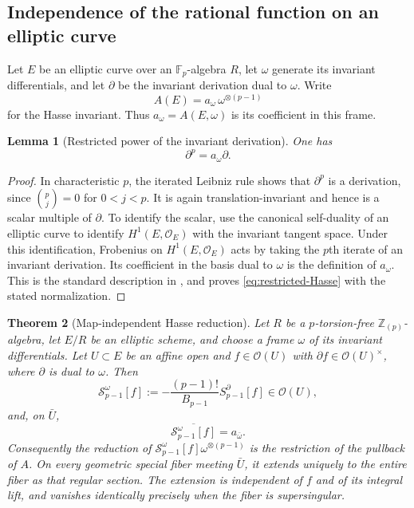 \documentclass[11pt]{amsart}
\newtheorem{thm}{Theorem}[section]
\newtheorem{lem}[thm]{Lemma}
\theoremstyle{definition}
\theoremstyle{remark}
\numberwithin{equation}{section}
\begin{document}
\subsection{Independence of the rational function on an elliptic curve}

Let $E$ be an elliptic curve over an $\mathbb F_p$-algebra $R$, let
$\omega$ generate its invariant differentials, and let $\partial$ be
the invariant derivation dual to $\omega$. Write
\[
A(E)=a_\omega\,\omega^{\otimes(p-1)}
\]
for the Hasse invariant. Thus $a_\omega=A(E,\omega)$ is its coefficient
in this frame.

\begin{lem}[Restricted power of the invariant derivation]
\label{lem:restricted-Hasse}
One has
\begin{equation}\label{eq:restricted-Hasse}
\partial^p=a_\omega\partial.
\end{equation}
\end{lem}

\begin{proof}
In characteristic $p$, the iterated Leibniz rule shows that $\partial^p$
is a derivation, since $\binom pj=0$ for $0<j<p$. It is again
translation-invariant and hence is a scalar multiple of $\partial$.
To identify the scalar, use the canonical self-duality of an elliptic
curve to identify $H^1(E,\mathcal O_E)$ with the invariant tangent
space. Under this identification, Frobenius on $H^1(E,\mathcal O_E)$
acts by taking the $p$th iterate of an invariant derivation. Its
coefficient in the basis dual to $\omega$ is the definition of
$a_\omega$. This is the standard description in
\cite[\S2.0, pp.~97--98]{katz}, and proves
\eqref{eq:restricted-Hasse} with the stated normalization.
\end{proof}

\begin{thm}[Map-independent Hasse reduction]\label{thm:general-Hasse}
Let $R$ be a $p$-torsion-free $\mathbb Z_{(p)}$-algebra, let $E/R$ be
an elliptic scheme, and choose a frame $\omega$ of its invariant
differentials. Let $U\subset E$ be an affine open and $f\in\mathcal O(U)$
with $\partial f\in\mathcal O(U)^\times$, where $\partial$ is dual to
$\omega$. Then
\[
\mathcal S_{p-1}^\omega[f]
:=-\frac{(p-1)!}{B_{p-1}}S_{p-1}^\partial[f]
\in\mathcal O(U),
\]
and, on $\bar U$,
\begin{equation}\label{eq:general-Hasse-reduction}
\overline{\mathcal S_{p-1}^\omega[f]}=a_{\bar\omega}.
\end{equation}
Consequently the reduction of
$\mathcal S_{p-1}^\omega[f]\omega^{\otimes(p-1)}$
is the restriction of the pullback of $A$. On every geometric special
fiber meeting $\bar U$, it extends uniquely to the entire fiber as
that regular section. The extension is independent of $f$ and of its
integral lift, and vanishes identically precisely when the fiber is
supersingular.
\end{thm}
\end{document}
